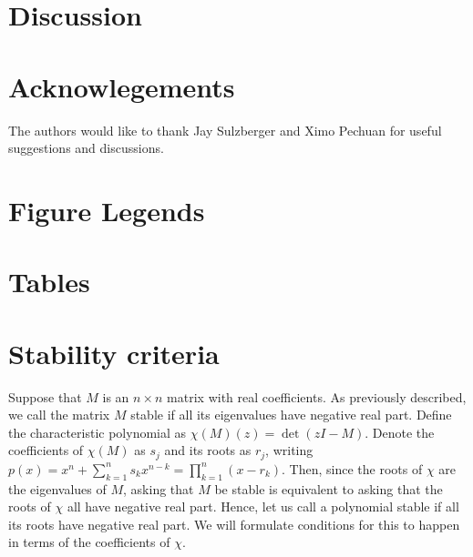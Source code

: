 \section{Discussion}

\section{Acknowlegements}  The authors would like to thank Jay Sulzberger and Ximo Pechuan for useful suggestions and discussions.

\newpage




\newpage
\FloatBarrier

\section{Figure Legends}


\newpage
\FloatBarrier

\section{Tables}





% 

\section{Stability criteria}
Suppose that $M$ is an $n \times n$ matrix with real coefficients.
As previously described, we call
the matrix $M$ stable if all its eigenvalues have negative real part.
Define the characteristic polynomial as $\chi(M)(z) = \det(zI - M)$.
Denote the coefficients of $\chi(M)$ as $s_j$ and its roots as $r_j$,
writing $p(x) = x^n + \sum_{k=1}^n s_k x^{n-k} = \prod_{k=1}^n (x-r_k)$.
Then, since the roots of $\chi$ are the eigenvalues of $M$, asking that
$M$ be stable is equivalent to asking that the roots of $\chi$ all have
negative real part.  Hence, let us call a polynomial stable if all its
roots have negative real part.  We will formulate conditions for this to
happen in terms of the coefficients of $\chi$.

